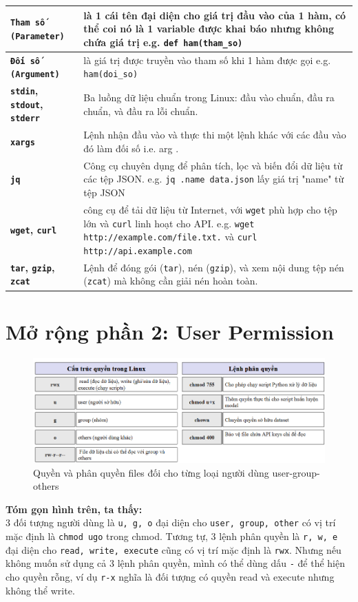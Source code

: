 \documentclass[11pt]{article}
\begin{document}
\begin{longtable}{>{\RaggedRight\bfseries}p{} >{\RaggedRight\arraybackslash}p{}}
\midrule
\texttt{Tham số (Parameter)} & là 1 cái tên đại diện cho giá trị đầu vào của 1 hàm, có thể coi nó là 1 variable được khai báo nhưng không chứa giá trị e.g. \texttt{def ham(tham\_so)} \\
\midrule
\texttt{Đối số (Argument)} & là giá trị được truyền vào tham số khi 1 hàm được gọi e.g. \texttt{ham(doi\_so)} \\
\midrule
\texttt{stdin}, \texttt{stdout}, \texttt{stderr} & Ba luồng dữ liệu chuẩn trong Linux: đầu vào chuẩn, đầu ra chuẩn, và đầu ra lỗi chuẩn. \\
\midrule
\texttt{xargs} & Lệnh nhận đầu vào và thực thi một lệnh khác với các đầu vào đó làm đối số i.e. arg . \\
\midrule
\texttt{jq} & Công cụ chuyên dụng để phân tích, lọc và biến đổi dữ liệu từ các tệp JSON. e.g. \texttt{jq .name data.json} lấy giá trị "name"  từ tệp JSON  \\
\midrule
\texttt{wget}, \texttt{curl} & công cụ để tải dữ liệu từ Internet, với \texttt{wget} phù hợp cho tệp lớn và \texttt{curl} linh hoạt cho API. e.g. \texttt{wget http://example.com/file.txt.} và \texttt{curl http://api.example.com} \\
\midrule
\texttt{tar}, \texttt{gzip}, \texttt{zcat} & Lệnh để đóng gói (\texttt{tar}), nén (\texttt{gzip}), và xem nội dung tệp nén (\texttt{zcat}) mà không cần giải nén hoàn toàn. \\
\end{longtable}

\section{Mở rộng phần 2: User Permission}
\begin{figure}[H]
	\centering
	\includegraphics[width=0.8 \textwidth]{user_permission.png}
	\caption{Quyền và phân quyền files đối cho từng loại người dùng user-group-others}
	\label{fig:user_permission}
\end{figure}

\textbf{Tóm gọn hình trên, ta thấy:} \\
3 đối tượng người dùng là \texttt{u, g, o} đại diện cho \texttt{user, group, other} có vị trí mặc định là \texttt{chmod ugo} trong chmod.  Tương tự, 3 lệnh phân quyền là \texttt{r, w, e} đại diện cho \texttt{read, write, execute} cũng có vị trí mặc định là \texttt{rwx}. Nhưng nếu không muốn sử dụng cả 3 lệnh phân quyền, mình có thể dùng dấu \texttt{-} để thể hiện cho quyền rỗng, ví dụ \texttt{r-x} nghĩa là đối tượng có quyền read và execute nhưng không thể write.
\end{document}
